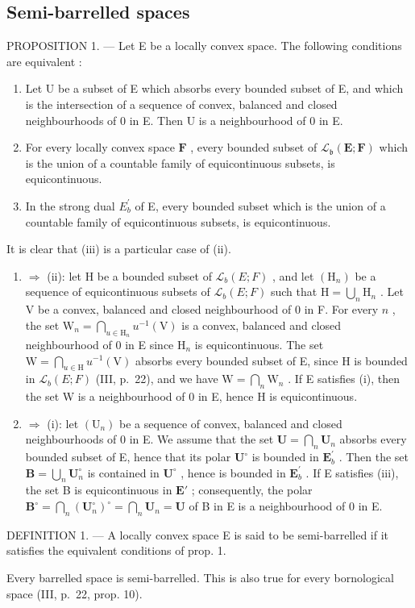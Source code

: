 \subsection{Semi-barrelled spaces}

PROPOSITION 1. --- Let E be a locally convex space. The following conditions are equivalent :

\begin{enumerate}
\def\labelenumi{(\roman{enumi})}
\item
  Let U be a subset of E which absorbs every bounded subset of E, and which is the intersection of a sequence of convex, balanced and closed neighbourhoods of 0 in E. Then U is a neighbourhood of 0 in E.
\item
  For every locally convex space \(\mathbf{F}\) , every bounded subset of \(\mathcal{L}_{\mathfrak{b}}(\mathbf{E};\mathbf{F})\) which is the union of a countable family of equicontinuous subsets, is equicontinuous.
\item
  In the strong dual \(E_{b}^{\prime}\) of E, every bounded subset which is the union of a countable family of equicontinuous subsets, is equicontinuous.
\end{enumerate}

It is clear that (iii) is a particular case of (ii).

\begin{enumerate}
\def\labelenumi{(\roman{enumi})}
\item
  \(\Rightarrow\) (ii): let H be a bounded subset of \(\mathcal{L}_b(E;F)\) , and let \((\mathrm{H}_n)\) be a sequence of equicontinuous subsets of \(\mathcal{L}_b(E;F)\) such that \(\mathrm{H} = \bigcup_{n}\mathrm{H}_{n}\) . Let V be a convex, balanced and closed neighbourhood of 0 in F. For every \(n\) , the set \(\mathrm{W}_n = \bigcap_{u\in \mathrm{H}_n}u^{-1}(\mathrm{V})\) is a convex, balanced and closed neighbourhood of 0 in E since \(\mathrm{H}_n\) is equicontinuous. The set \(\mathrm{W} = \bigcap_{u\in \mathrm{H}}u^{-1}(\mathrm{V})\) absorbs every bounded subset of E, since H is bounded in \(\mathcal{L}_b(E;F)\) (III, p.~22), and we have \(\mathrm{W} = \bigcap_{n}\mathrm{W}_{n}\) . If E satisfies (i), then the set W is a neighbourhood of 0 in E, hence H is equicontinuous.
\item
  \(\Rightarrow\) (i): let \((\mathrm{U}_n)\) be a sequence of convex, balanced and closed neighbourhoods of 0 in E. We assume that the set \(\mathbf{U} = \bigcap_{n}\mathbf{U}_{n}\) absorbs every bounded subset of E, hence that its polar \(\mathbf{U}^{\circ}\) is bounded in \(\mathbf{E}_b^\prime\) . Then the set \(\mathbf{B} = \bigcup_{n}\mathbf{U}_{n}^{\circ}\) is contained in \(\mathbf{U}^{\circ}\) , hence is bounded in \(\mathbf{E}_b^\prime\) . If E satisfies (iii), the set B is equicontinuous in \(\mathbf{E}'\) ; consequently, the polar \(\mathbf{B}^{\circ} = \bigcap_{n}(\mathbf{U}_{n}^{\circ})^{\circ} = \bigcap_{n}\mathbf{U}_{n} = \mathbf{U}\) of B in E is a neighbourhood of 0 in E.
\end{enumerate}

DEFINITION 1. --- A locally convex space E is said to be semi-barrelled if it satisfies the equivalent conditions of prop. 1.

Every barrelled space is semi-barrelled. This is also true for every bornological space (III, p.~22, prop. 10).

